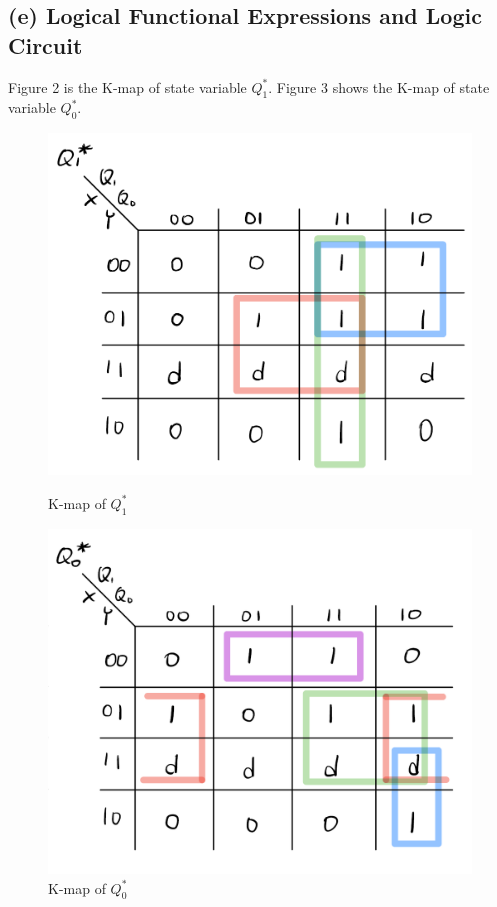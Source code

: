 \documentclass{article}
\begin{document}
\subsection*{(e) Logical Functional Expressions and Logic Circuit}
Figure 2 is the K-map of state variable $Q_1^*$. Figure 3 shows the K-map of state variable $Q_0^*$.
\begin{figure}[!ht]
    \centering
    \begin{minipage}{0.45\textwidth}
        \centering
        \includegraphics[width=.8\linewidth]{src/Part 1_Kmap_Q1.png}
        \caption{K-map of $Q_1^*$}
    \end{minipage}\hfill
    \begin{minipage}{0.45\textwidth}
        \centering
        \includegraphics[width=.8\linewidth]{src/Part 1_Kmap_Q0.png}
        \caption{K-map of $Q_0^*$}
    \end{minipage}
\end{figure}
\end{document}
